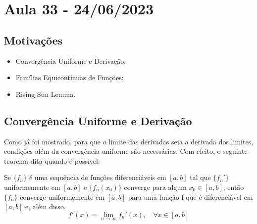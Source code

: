 \documentclass[../analysis_notes.tex]{subfiles}
\begin{document}
\section{Aula 33 - 24/06/2023}
\subsection{Motivações}
\begin{itemize}
	\item Convergência Uniforme e Derivação;
	\item Famílias Equicontínuas de Funções;
	\item Rising Sun Lemma.
\end{itemize}
\subsection{Convergência Uniforme e Derivação}
Como já foi mostrado, para que o limite das derivadas seja a derivada dos limites, condições além da convergência uniforme são necessárias. Com efeito, o seguinte teorema dita quando é possível:
\begin{theorem*}
	Se \(\{f_{n}\}\) é uma sequência de funções diferenciáveis em \([a, b]\) tal que \(\{f_{n}'\}\) uniformemente em \([a, b]\) e \(\{f_{n}(x_{0})\}\) converge para algum \(x_{0}\in [a, b]\), então \(\{f_{n}\}\) converge uniformemente em \([a, b]\) para uma função f que é diferenciável em \([a, b]\) e, além disso,
	\[
		f'(x)=\lim_{n\to \infty}f_{n}'(x),\quad \forall x\in [a, b]
	\]
\end{theorem*}
\end{document}
